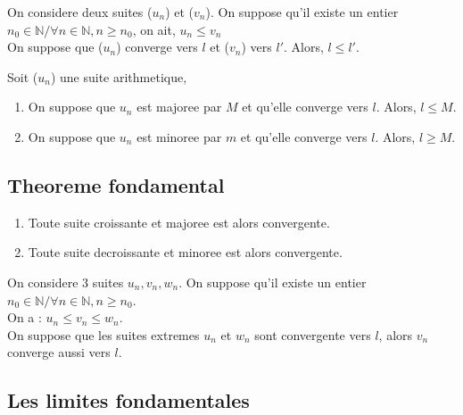 \documentclass[a4paper,10pt]{book}
\begin{document}
	\begin{prop}
		On considere deux suites ($u_n$) et ($v_n$). On suppose qu'il existe un entier $n_0 \in \mathbb{N} / \forall n \in \mathbb{N}, n \geq n_0$, on ait, $u_n \leq v_n$\\
		On suppose que ($u_n$) converge vers $l$ et ($v_n$) vers $l'$. Alors, $l \leq l'$.
	\end{prop}

	\begin{prop}
		Soit ($u_n$) une suite arithmetique,
		\begin{enumerate}
			\item On suppose que $u_n$ est majoree par $M$ et qu'elle converge vers $l$. Alors, $l \leq M$.
			\item On suppose que $u_n$ est minoree par $m$ et qu'elle converge vers $l$. Alors, $l \geq M$.
		\end{enumerate}
	\end{prop}

	\subsection{Theoreme fondamental}
	\label{sub:Theoreme fondamental}

	\begin{prop}
		\begin{enumerate}
			\item Toute suite croissante et majoree est alors convergente.
			\item Toute suite decroissante et minoree est alors convergente.
		\end{enumerate}
	\end{prop}

	\begin{prop}
		On considere 3 suites $u_n, v_n, w_n$. On suppose qu'il existe un entier $n_0 \in \mathbb{N} / \forall n \in \mathbb{N}, n \geq n_0$.\\
		On a : $u_n \leq v_n \leq w_n$.\\
		On suppose que les suites extremes $u_n$ et $w_n$ sont convergente vers $l$, alors $v_n$ converge aussi vers $l$.
	\end{prop}

	\subsection{Les limites fondamentales}
	\label{sub:Les limites fondamentales}
\end{document}
